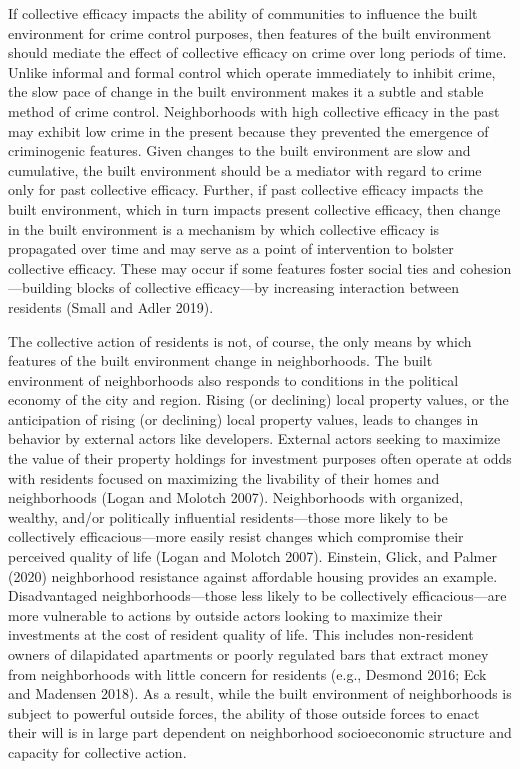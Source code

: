 \documentclass [11pt, proquest] {uwthesis}[2015/03/03]
\begin{document}
If collective efficacy impacts the ability of communities to influence the built environment for crime control purposes, then features of the built environment should mediate the effect of collective efficacy on crime over long periods of time. Unlike informal and formal control which operate immediately to inhibit crime, the slow pace of change in the built environment makes it a subtle and stable method of crime control. Neighborhoods with high collective efficacy in the past may exhibit low crime in the present because they prevented the emergence of criminogenic features. Given changes to the built environment are slow and cumulative, the built environment should be a mediator with regard to crime only for past collective efficacy. Further, if past collective efficacy impacts the built environment, which in turn impacts present collective efficacy, then change in the built environment is a mechanism by which collective efficacy is propagated over time and may serve as a point of intervention to bolster collective efficacy. These may occur if some features foster social ties and cohesion---building blocks of collective efficacy---by increasing interaction between residents (Small and Adler 2019).

The collective action of residents is not, of course, the only means by which features of the built environment change in neighborhoods. The built environment of neighborhoods also responds to conditions in the political economy of the city and region. Rising (or declining) local property values, or the anticipation of rising (or declining) local property values, leads to changes in behavior by external actors like developers. External actors seeking to maximize the value of their property holdings for investment purposes often operate at odds with residents focused on maximizing the livability of their homes and neighborhoods (Logan and Molotch 2007). Neighborhoods with organized, wealthy, and/or politically influential residents---those more likely to be collectively efficacious---more easily resist changes which compromise their perceived quality of life (Logan and Molotch 2007). Einstein, Glick, and Palmer (2020) neighborhood resistance against affordable housing provides an example. Disadvantaged neighborhoods---those less likely to be collectively efficacious---are more vulnerable to actions by outside actors looking to maximize their investments at the cost of resident quality of life. This includes non-resident owners of dilapidated apartments or poorly regulated bars that extract money from neighborhoods with little concern for residents (e.g., Desmond 2016; Eck and Madensen 2018). As a result, while the built environment of neighborhoods is subject to powerful outside forces, the ability of those outside forces to enact their will is in large part dependent on neighborhood socioeconomic structure and capacity for collective action.
\end{document}
